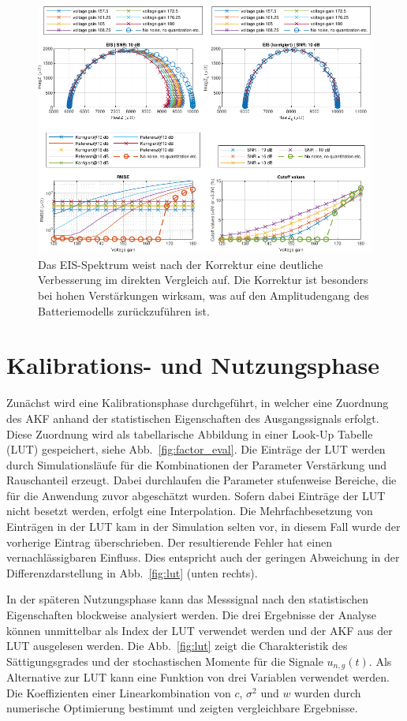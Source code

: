 \begin{figure}[t!]
	\centering
	\includegraphics[width=.9\textwidth]{../img/ergebnisse.pdf}
	\caption{Das EIS-Spektrum weist nach der Korrektur eine deutliche Verbesserung im direkten Vergleich auf. Die Korrektur ist besonders bei hohen Verstärkungen wirksam, was auf den Amplitudengang des Batteriemodells zurückzuführen ist.}
	\label{fig:Ergebnisse} 
\end{figure}

\section{Kalibrations- und Nutzungsphase}

Zunächst wird eine Kalibrationsphase durchgeführt, in welcher eine Zuordnung des AKF anhand der statistischen Eigenschaften des Ausgangssignals erfolgt. Diese Zuordnung wird als tabellarische Abbildung in einer Look-Up Tabelle (LUT) gespeichert, siehe Abb.~\ref{fig:factor_eval}. 
Die Einträge der LUT werden durch Simulationsläufe für die Kombinationen der Parameter Verstärkung und Rauschanteil erzeugt. Dabei durchlaufen die Parameter stufenweise Bereiche, die für die Anwendung zuvor abgeschätzt wurden. Sofern dabei Einträge der LUT nicht besetzt werden, erfolgt eine Interpolation.
Die Mehrfachbesetzung von Einträgen in der LUT kam in der Simulation selten vor, in diesem Fall wurde der vorherige Eintrag überschrieben. Der resultierende Fehler hat einen vernachlässigbaren Einfluss. Dies entspricht auch der geringen Abweichung in der Differenzdarstellung in Abb.~\ref{fig:lut} (unten rechts). 

In der späteren Nutzungsphase kann das Messsignal nach den statistischen Eigenschaften blockweise analysiert werden. Die drei Ergebnisse der Analyse können unmittelbar als Index der LUT verwendet werden und der AKF aus der LUT ausgelesen werden. Die Abb.~\ref{fig:lut} zeigt die Charakteristik des Sättigungsgrades und der stochastischen Momente für die Signale $u_{n,g}(t)$. Als Alternative zur LUT kann eine Funktion von drei Variablen verwendet werden. Die Koeffizienten einer Linearkombination von $c$, $\sigma^2$ und $w$ wurden durch numerische Optimierung bestimmt und zeigten vergleichbare Ergebnisse.

